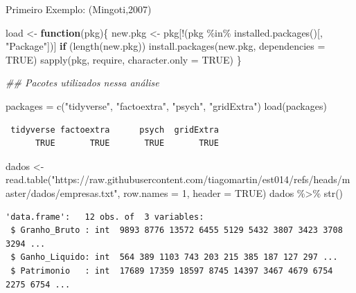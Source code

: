 \documentclass[
  ignorenonframetext,
  aspectratio=169,
]{beamer}
\newenvironment{Shaded}{\begin{snugshade}}{\end{snugshade}}
\newcommand{\AttributeTok}[1]{\textcolor[rgb]{0.40,0.45,0.13}{#1}}
\newcommand{\ConstantTok}[1]{\textcolor[rgb]{0.56,0.35,0.01}{#1}}
\newcommand{\ControlFlowTok}[1]{\textcolor[rgb]{0.00,0.23,0.31}{\textbf{#1}}}
\newcommand{\DecValTok}[1]{\textcolor[rgb]{0.68,0.00,0.00}{#1}}
\newcommand{\DocumentationTok}[1]{\textcolor[rgb]{0.37,0.37,0.37}{\textit{#1}}}
\newcommand{\FunctionTok}[1]{\textcolor[rgb]{0.28,0.35,0.67}{#1}}
\newcommand{\NormalTok}[1]{\textcolor[rgb]{0.00,0.23,0.31}{#1}}
\newcommand{\OtherTok}[1]{\textcolor[rgb]{0.00,0.23,0.31}{#1}}
\newcommand{\SpecialCharTok}[1]{\textcolor[rgb]{0.37,0.37,0.37}{#1}}
\newcommand{\StringTok}[1]{\textcolor[rgb]{0.13,0.47,0.30}{#1}}
\begin{document}
\begin{frame}[fragile]{Primeiro Exemplo: (Mingoti,2007)}
\label{primeiro-exemplo-mingoti2007}
\begin{Shaded}
\begin{Highlighting}[]
\NormalTok{load }\OtherTok{\textless{}{-}} \ControlFlowTok{function}\NormalTok{(pkg)\{}
\NormalTok{  new.pkg }\OtherTok{\textless{}{-}}\NormalTok{ pkg[}\SpecialCharTok{!}\NormalTok{(pkg }\SpecialCharTok{\%in\%} \FunctionTok{installed.packages}\NormalTok{()[, }\StringTok{"Package"}\NormalTok{])]}
  \ControlFlowTok{if}\NormalTok{ (}\FunctionTok{length}\NormalTok{(new.pkg))}
    \FunctionTok{install.packages}\NormalTok{(new.pkg, }\AttributeTok{dependencies =} \ConstantTok{TRUE}\NormalTok{)}
  \FunctionTok{sapply}\NormalTok{(pkg, require, }\AttributeTok{character.only =} \ConstantTok{TRUE}\NormalTok{)}
\NormalTok{\} }

\DocumentationTok{\#\# Pacotes utilizados nessa análise}

\NormalTok{packages }\OtherTok{=} \FunctionTok{c}\NormalTok{(}\StringTok{"tidyverse"}\NormalTok{, }\StringTok{"factoextra"}\NormalTok{, }\StringTok{"psych"}\NormalTok{, }\StringTok{"gridExtra"}\NormalTok{)}
\FunctionTok{load}\NormalTok{(packages)}
\end{Highlighting}
\end{Shaded}

\begin{verbatim}
 tidyverse factoextra      psych  gridExtra 
      TRUE       TRUE       TRUE       TRUE 
\end{verbatim}

\begin{Shaded}
\begin{Highlighting}[]
\NormalTok{dados }\OtherTok{\textless{}{-}} \FunctionTok{read.table}\NormalTok{(}\StringTok{"https://raw.githubusercontent.com/tiagomartin/est014/refs/heads/master/dados/empresas.txt"}\NormalTok{, }\AttributeTok{row.names =} \DecValTok{1}\NormalTok{, }\AttributeTok{header =} \ConstantTok{TRUE}\NormalTok{) }
\NormalTok{dados }\SpecialCharTok{\%\textgreater{}\%} 
  \FunctionTok{str}\NormalTok{()}
\end{Highlighting}
\end{Shaded}

\begin{verbatim}
'data.frame':   12 obs. of  3 variables:
 $ Granho_Bruto : int  9893 8776 13572 6455 5129 5432 3807 3423 3708 3294 ...
 $ Ganho_Liquido: int  564 389 1103 743 203 215 385 187 127 297 ...
 $ Patrimonio   : int  17689 17359 18597 8745 14397 3467 4679 6754 2275 6754 ...
\end{verbatim}
\end{frame}
\end{document}
